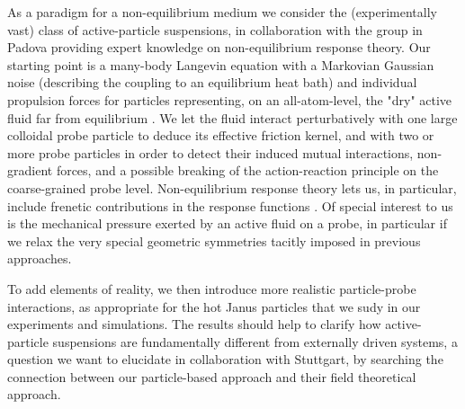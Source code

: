 \begin{workpackage}
\begin{tasklist}

\begin{task}[title=Non-Equilibrium Equations of State (NEOS),id=task1,PM=8,lead=Leipzig,partners={Padova,USTUTT},wphases=0-48!0.5]
As a paradigm for a non-equilibrium medium we consider the (experimentally vast) class of
active-particle suspensions, in collaboration with the group in Padova providing expert knowledge on 
non-equilibrium response theory.
%
Our starting point is a many-body Langevin equation with a Markovian Gaussian noise
(describing the coupling to an equilibrium heat bath) and individual propulsion forces for
particles representing, on an all-atom-level, the "dry" active fluid far from equilibrium \cite{solon-etal:2015}. 
%
We let the fluid interact perturbatively with one large colloidal probe particle to
deduce its effective friction kernel, and with two or more probe particles in order to
detect their induced mutual interactions, non-gradient forces, and a possible breaking of
the action-reaction principle on the coarse-grained probe level.  
%
Non-equilibrium response theory lets us, in particular, include frenetic contributions in the response 
functions \cite{baiesi-wynants:2009}.
%
Of special interest to us is the mechanical pressure exerted by an active fluid on a probe, 
in particular if we relax the very special geometric symmetries tacitly imposed in previous approaches.

To add elements of reality, we then introduce more realistic particle-probe interactions, as appropriate for the hot 
Janus particles that we sudy in our experiments and simulations.
%
The results should help to clarify how active-particle suspensions are fundamentally different from externally driven systems, 
a question we want to elucidate in collaboration with Stuttgart, by searching   
the connection between our particle-based approach and their field theoretical approach.

\end{task}


\end{tasklist}
\end{workpackage}
